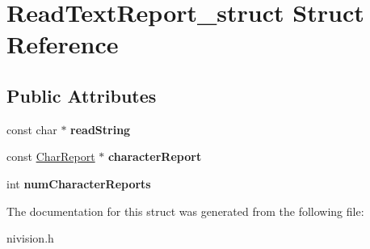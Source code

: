 \hypertarget{structReadTextReport__struct}{
\section{ReadTextReport\_\-struct Struct Reference}
\label{structReadTextReport__struct}
}
\subsection*{Public Attributes}
\begin{DoxyCompactItemize}
\item 
\hypertarget{structReadTextReport__struct_a1744b020cdbfb6f0fe227ad620280231}{
const char $\ast$ {\bfseries readString}}
\label{structReadTextReport__struct_a1744b020cdbfb6f0fe227ad620280231}

\item 
\hypertarget{structReadTextReport__struct_ae5066351fe209d05de3393ca3e462b8f}{
const \hyperlink{structCharReport__struct}{CharReport} $\ast$ {\bfseries characterReport}}
\label{structReadTextReport__struct_ae5066351fe209d05de3393ca3e462b8f}

\item 
\hypertarget{structReadTextReport__struct_aa7dde1044c8d800f7628c8e5ade9c44c}{
int {\bfseries numCharacterReports}}
\label{structReadTextReport__struct_aa7dde1044c8d800f7628c8e5ade9c44c}

\end{DoxyCompactItemize}


The documentation for this struct was generated from the following file:\begin{DoxyCompactItemize}
\item 
nivision.h\end{DoxyCompactItemize}
